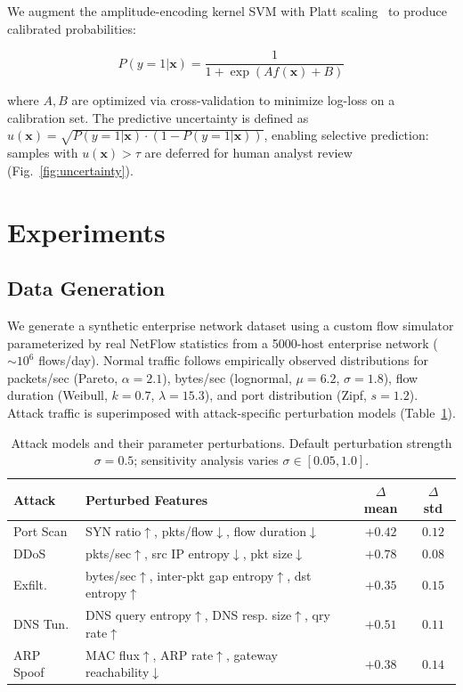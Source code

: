 \documentclass[twocolumn,a4paper,11pt]{article}
\begin{document}
We augment the amplitude-encoding kernel SVM with Platt scaling~\cite{platt1999probabilistic}
to produce calibrated probabilities:

\begin{equation}
P(y=1 | \mathbf{x}) = \frac{1}{1 + \exp(A f(\mathbf{x}) + B)}
\label{eq:platt}
\end{equation}

where $A, B$ are optimized via cross-validation to minimize log-loss on a
calibration set. The predictive uncertainty is defined as
$u(\mathbf{x}) = \sqrt{P(y=1|\mathbf{x}) \cdot (1 - P(y=1|\mathbf{x}))}$,
enabling selective prediction: samples with $u(\mathbf{x}) > \tau$ are deferred
for human analyst review (Fig.~\ref{fig:uncertainty}).

\section{Experiments}
\label{sec:experiments}

\subsection{Data Generation}

We generate a synthetic enterprise network dataset using a custom flow simulator
parameterized by real NetFlow statistics from a 5000-host enterprise network
($\sim 10^6$ flows/day). Normal traffic follows empirically observed distributions
for packets/sec (Pareto, $\alpha = 2.1$), bytes/sec (lognormal, $\mu = 6.2$,
$\sigma = 1.8$), flow duration (Weibull, $k = 0.7$, $\lambda = 15.3$), and port
distribution (Zipf, $s = 1.2$). Attack traffic is superimposed with
attack-specific perturbation models (Table~\ref{tab:attacks}).

\begin{table}[t]
  \centering
  \caption{Attack models and their parameter perturbations. Default perturbation
  strength $\sigma = 0.5$; sensitivity analysis varies $\sigma \in [0.05, 1.0]$.}
  \label{tab:attacks}
  \small
  \begin{tabular}{lp{6cm}cc}
    \toprule
    \textbf{Attack} & \textbf{Perturbed Features} & $\Delta$ mean & $\Delta$ std \\
    \midrule
    Port Scan & SYN ratio$\uparrow$, pkts/flow$\downarrow$, flow duration$\downarrow$ & $+0.42$ & $0.12$ \\
    DDoS      & pkts/sec$\uparrow$, src IP entropy$\downarrow$, pkt size$\downarrow$ & $+0.78$ & $0.08$ \\
    Exfilt.   & bytes/sec$\uparrow$, inter-pkt gap entropy$\uparrow$, dst entropy$\uparrow$ & $+0.35$ & $0.15$ \\
    DNS Tun.  & DNS query entropy$\uparrow$, DNS resp. size$\uparrow$, qry rate$\uparrow$ & $+0.51$ & $0.11$ \\
    ARP Spoof & MAC flux$\uparrow$, ARP rate$\uparrow$, gateway reachability$\downarrow$ & $+0.38$ & $0.14$ \\
    \bottomrule
  \end{tabular}
\end{table}
\end{document}
